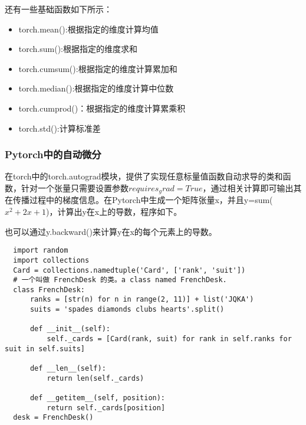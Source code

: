 \documentclass[cn,hazy,blue,14pt,screen]{elegantnote}
\begin{document}
还有一些基础函数如下所示：
\begin{itemize}
  \item torch.mean():根据指定的维度计算均值
  \item torch.sum():根据指定的维度求和
  \item torch.cumsum():根据指定的维度计算累加和
  \item torch.median():根据指定的维度计算中位数
  \item torch.cumprod()：根据指定的维度计算累乘积
  \item torch.std():计算标准差
\end{itemize}

\subsubsection{Pytorch中的自动微分}

在torch中的torch.autograd模块，提供了实现任意标量值函数自动求导的类和函数，针对一个张量只需要设置参数$requires_grad=True$，通过相关计算即可输出其在传播过程中的梯度信息。在Pytorch中生成一个矩阵张量x，并且y=sum($x^2+2x+1$)，计算出y在x上的导数，程序如下。

也可以通过y.backward()来计算y在x的每个元素上的导数。

\begin{lstlisting}
  import random
  import collections
  Card = collections.namedtuple('Card', ['rank', 'suit'])
  # 一个叫做 FrenchDesk 的类。a class named FrenchDesk.
  class FrenchDesk:
      ranks = [str(n) for n in range(2, 11)] + list('JQKA')
      suits = 'spades diamonds clubs hearts'.split()
      
      def __init__(self):
          self._cards = [Card(rank, suit) for rank in self.ranks for suit in self.suits]
          
      def __len__(self):
          return len(self._cards)
          
      def __getitem__(self, position):
          return self._cards[position]
  desk = FrenchDesk()
\end{lstlisting}


\end{document}
